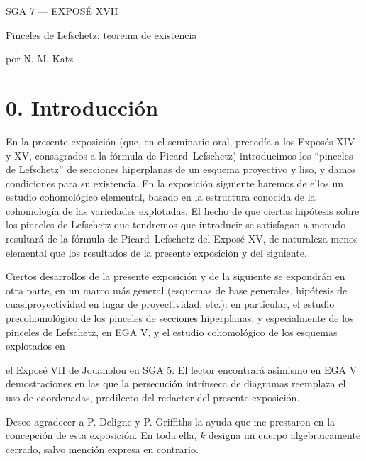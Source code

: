 \pageoriginale

\clearpage
{}
\begin{center}
{\large SGA 7 --- EXPOSÉ XVII}\par
\vspace{2em}
{\Large\underline{\underline{Pinceles de Lefschetz: teorema de existencia}}}\par
\vspace{1.5em}
{\large por N. M. Katz}
\end{center}

\section*{0. Introducción}

En la presente exposición (que, en el seminario oral, precedía a los
Exposés XIV y XV, consagrados a la fórmula de Picard--Lefschetz)
introducimos los ``pinceles de Lefschetz'' de secciones hiperplanas de
un esquema proyectivo y liso, y damos condiciones para su existencia.
En la exposición siguiente haremos de ellos un estudio cohomológico
elemental, basado en la estructura conocida de la cohomología de las
variedades explotadas. El hecho de que ciertas hipótesis sobre los
pinceles de Lefschetz que tendremos que introducir se satisfagan a
menudo resultará de la fórmula de Picard--Lefschetz del Exposé XV, de
naturaleza menos elemental que los resultados de la presente exposición y
del siguiente.

Ciertos desarrollos de la presente exposición y de la siguiente se expondrán
en otra parte, en un marco más general (esquemas de base generales,
hipótesis de cuasiproyectividad en lugar de proyectividad, etc.):
en particular, el estudio precohomológico de los pinceles de secciones
hiperplanas, y especialmente de los pinceles de Lefschetz, en EGA V,
y el estudio cohomológico de los esquemas explotados en

\pageoriginale

el Exposé VII de Jouanolou en SGA 5. El lector encontrará asimismo en
EGA V demostraciones en las que la persecución intrínseca de diagramas
reemplaza el uso de coordenadas, predilecto del redactor del presente
exposición.

Deseo agradecer a P. Deligne y P. Griffiths la ayuda que me prestaron
en la concepción de esta exposición. En toda ella, $k$ designa un cuerpo
algebraicamente cerrado, salvo mención expresa en contrario.

